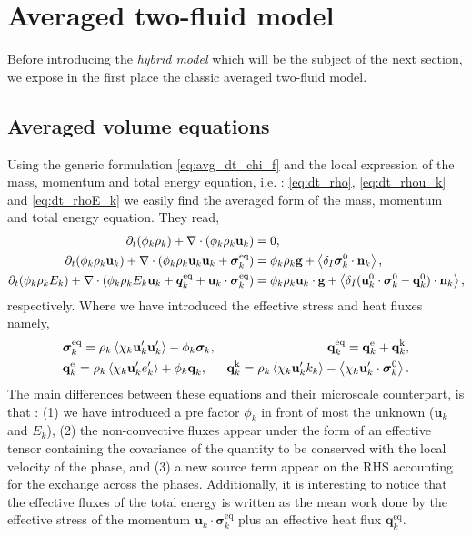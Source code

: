 \section{Averaged two-fluid model}
\label{ap:two-fluid_model}
Before introducing the \textit{hybrid model} which will be the subject of the next section, we expose in the first place the classic averaged two-fluid model. 

\subsection{Averaged volume equations}
Using the generic formulation \ref{eq:avg_dt_chi_f} and the local expression of the mass, momentum and total energy equation, i.e. : \ref{eq:dt_rho}, \ref{eq:dt_rhou_k} and \ref{eq:dt_rhoE_k} we easily find the averaged form of the mass, momentum and total energy equation.
They read, 
\begin{align}
    \label{eq:dt_avg_rho_k}
    \partial_t (\phi_k \rho_k)  
    + \mathbf{\nabla}\cdot (
        \phi_k \rho_k\textbf{u}_k
    )
    &= 
    0,\\
    \label{eq:dt_avg_rhou_k}
    \partial_t (\phi_k \rho_k\textbf{u}_k)  
    + \mathbf{\nabla}\cdot (
        \phi_k \rho_k\textbf{u}_k\textbf{u}_k
        + \bm{\sigma}_k^\text{eq}
    )
    &= 
    \phi_k \rho_k \textbf{g} 
    +  \left<\delta_I \bm{\sigma}_k^0 \cdot \textbf{n}_k\right>,\\
    \label{eq:dt_avg_rhoE_k}
    \partial_t (\phi_k\rho_kE_k)  
    + \mathbf{\nabla}\cdot (
        \phi_k\rho_kE_k\textbf{u}_k
        + \bm{q}_k^\text{eq}
        + \textbf{u}_k \cdot \bm{\sigma}_k^\text{eq}
        )
    &= 
    \phi_k \rho_k\textbf{u}_k \cdot \textbf{g} 
    + \left<\delta_I (\textbf{u}_k^0 \cdot \bm{\sigma}_k^0 - \textbf{q}_k^0)\cdot \textbf{n}_k\right>,
\end{align} 
respectively. 
Where we have introduced the effective stress and heat fluxes namely, 
\begin{align*}
    &\bm{\sigma}_k^\text{eq}
    = 
     \rho_k\avg{\chi_k \textbf{u}_k'\textbf{u}_k'}
      - \phi_k \bm{\sigma}_k,%
    &\textbf{q}_k^\text{eq}
    =\textbf{q}_k^\text{e} +\textbf{q}_k^\text{k},  \\
    &\textbf{q}_k^\text{e}
    = \rho_k \avg{\chi_k\textbf{u}_k' e_k'} 
    + \phi_k\textbf{q}_k,
    &\textbf{q}_k^\text{k}
    = \rho_k \avg{\chi_k \textbf{u}_k' k_k} 
    - \avg{\chi_k \textbf{u}_k' \cdot \bm{\sigma}_k^0}.
\end{align*}
The main differences between these equations and their microscale counterpart, is that : 
(1) we have introduced a pre factor $\phi_k$ in front of most the unknown  ($\textbf{u}_k$ and $E_k$), 
(2) the non-convective fluxes appear under the form of an effective tensor containing the covariance of the quantity to be conserved with the local velocity of the phase, 
and (3) a new source term appear on the RHS accounting for the exchange across the phases. 
Additionally, it is interesting to notice that the effective fluxes of the total energy is written as the mean work done by the effective stress of the momentum $\textbf{u}_k \cdot \bm{\sigma}_k^\text{eq}$ plus an effective heat flux $\bm{q}_k^\text{eq}$. 


